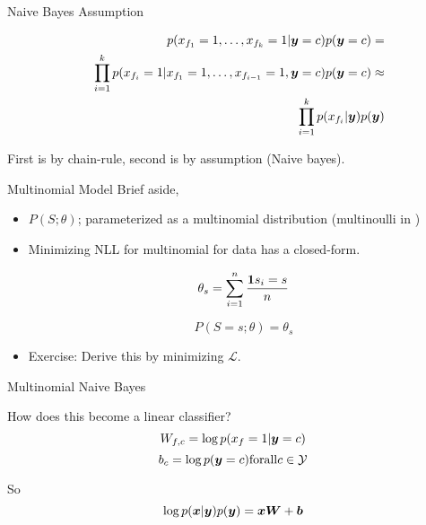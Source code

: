 \documentclass{beamer}
\begin{document}
\begin{frame}{Naive Bayes Assumption} 

  \begin{eqnarray*}
    && p(x_{f_1}=1, \ldots, x_{f_k}=1 | \boldsymbol{y}=c ) p(\boldsymbol{y}=c) =\\
     && \prod_{i=1}^k p(x_{f_i}=1 | x_{f_1}=1, \ldots, x_{f_{i-1}}=1, \boldsymbol{y}=c) p(\boldsymbol{y}=c) \approx \\
     && \prod_{i=1}^k p(x_{f_i} | \boldsymbol{y}) p(\boldsymbol{y})  
  \end{eqnarray*}

  
  First is by chain-rule, second is by assumption (Naive bayes). 

\end{frame}



\begin{frame}{Multinomial Model} 
  Brief aside, 
  \begin{itemize}
  \item $P(S; \theta)$; parameterized as a multinomial distribution (multinoulli in )  

  \item Minimizing NLL for multinomial for data has a closed-form.

    \[ \theta_s = \sum_{i=1}^n \frac{\boldsymbol{1}{s_i = s}}{n} \]

    \[ P(S=s; \theta) = \theta_s \]

  \item Exercise: Derive this by minimizing $\mathcal{L}$. 

  \end{itemize}
\end{frame}



\begin{frame}{Multinomial Naive Bayes}


  How does this become a linear classifier? 
  \[ W_{f, c} =  \log p(x_f = 1 | \boldsymbol{y}=c)  \] 
  \[ b_c = \log p(\boldsymbol{y}=c)  \mathrm{ for all  }c\in \mathcal{Y} \] 

  So 
  \[\log p(\boldsymbol{x} | \boldsymbol{y}) p(\boldsymbol{y}) =  \boldsymbol{x} \boldsymbol{W} + \boldsymbol{b}  \]
\end{frame}
\end{document}

